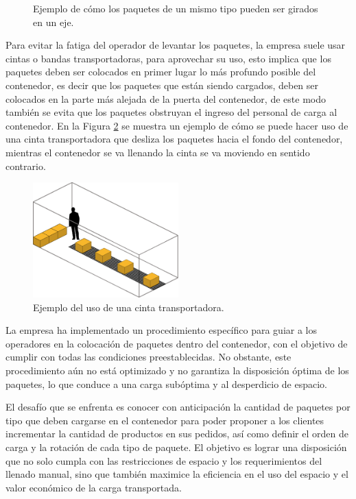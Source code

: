 \begin{figure}[H]
    \centering
    
    \caption{Ejemplo de cómo los paquetes de un mismo tipo pueden ser girados en un eje.}
    \label{fig:paquetes_girados}
\end{figure}

Para evitar la fatiga del operador de levantar los paquetes, la empresa suele usar cintas o bandas transportadoras, para aprovechar su uso, esto implica que los paquetes deben ser colocados en primer lugar lo más profundo posible del contenedor, es decir que los paquetes que están siendo cargados, deben ser colocados en la parte más alejada de la puerta del contenedor, de este modo también se evita que los paquetes obstruyan el ingreso del personal de carga al contenedor. En la Figura \ref{fig:cinta_transportadora} se muestra un ejemplo de cómo se puede hacer uso de una cinta transportadora que desliza los paquetes hacia el fondo del contenedor, mientras el contenedor se va llenando la cinta se va moviendo en sentido contrario.

\begin{figure}[H]
    \centering
    \includegraphics[width=0.5\textwidth]{Figures/cinta_transportadora.eps}
    \caption{Ejemplo del uso de una cinta transportadora.}
    \label{fig:cinta_transportadora}
\end{figure}

La empresa ha implementado un procedimiento específico para guiar a los operadores en la colocación de paquetes dentro del contenedor, con el objetivo de cumplir con todas las condiciones preestablecidas. No obstante, este procedimiento aún no está optimizado y no garantiza la disposición óptima de los paquetes, lo que conduce a una carga subóptima y al desperdicio de espacio.

El desafío que se enfrenta es conocer con anticipación la cantidad de paquetes por tipo que deben cargarse en el contenedor para poder proponer a los clientes incrementar la cantidad de productos en sus pedidos, así como definir el orden de carga y la rotación de cada tipo de paquete. El objetivo es lograr una disposición que no solo cumpla con las restricciones de espacio y los requerimientos del llenado manual, sino que también maximice la eficiencia en el uso del espacio y el valor económico de la carga transportada.

